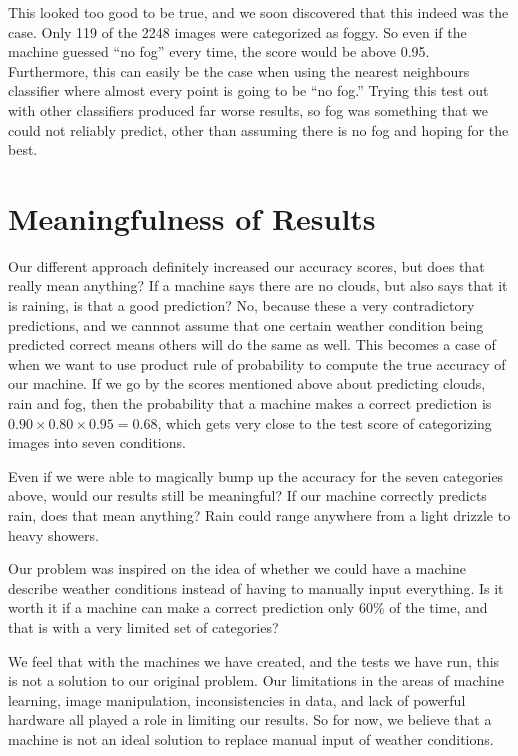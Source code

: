 This looked too good to be true, and we soon discovered that this indeed was the case. Only 119 of the 2248 images were categorized as foggy. So even if the machine guessed ``no fog'' every time, the score would be above 0.95. Furthermore, this can easily be the case when using the nearest neighbours classifier where almost every point is going to be ``no fog.'' Trying this test out with other classifiers produced far worse results, so fog was something that we could not reliably predict, other than assuming there is no fog and hoping for the best.

\section{Meaningfulness of Results}

Our different approach definitely increased our accuracy scores, but does that really mean anything? If a machine says there are no clouds, but also says that it is raining, is that a good prediction? No, because these a very contradictory predictions, and we cannnot assume that one certain weather condition being predicted correct means others will do the same as well. This becomes a case of when we want to use product rule of probability to compute the true accuracy of our machine. If we go by the scores mentioned above about predicting clouds, rain and fog, then the probability that a machine makes a correct prediction is $ 0.90 \times 0.80 \times 0.95 = 0.68 $, which gets very close to the test score of categorizing images into seven conditions.

Even if we were able to magically bump up the accuracy for the seven categories above, would our results still be meaningful? If our machine correctly predicts rain, does that mean anything? Rain could range anywhere from a light drizzle to heavy showers.

Our problem was inspired on the idea of whether we could have a machine describe weather conditions instead of having to manually input everything. Is it worth it if a machine can make a correct prediction only 60\% of the time, and that is with a very limited set of categories?

We feel that with the machines we have created, and the tests we have run, this is not a solution to our original problem. Our limitations in the areas of machine learning, image manipulation, inconsistencies in data, and lack of powerful hardware all played a role in limiting our results. So for now, we believe that a machine is not an ideal solution to replace manual input of weather conditions.

